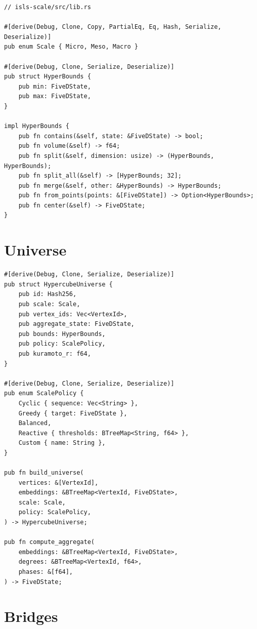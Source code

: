 \documentclass[11pt,a4paper,twoside]{article}
\theoremstyle{definition}
\theoremstyle{plain}
\theoremstyle{remark}
\begin{document}
\begin{verbatim}
// isls-scale/src/lib.rs

#[derive(Debug, Clone, Copy, PartialEq, Eq, Hash, Serialize, Deserialize)]
pub enum Scale { Micro, Meso, Macro }

#[derive(Debug, Clone, Serialize, Deserialize)]
pub struct HyperBounds {
    pub min: FiveDState,
    pub max: FiveDState,
}

impl HyperBounds {
    pub fn contains(&self, state: &FiveDState) -> bool;
    pub fn volume(&self) -> f64;
    pub fn split(&self, dimension: usize) -> (HyperBounds, HyperBounds);
    pub fn split_all(&self) -> [HyperBounds; 32];
    pub fn merge(&self, other: &HyperBounds) -> HyperBounds;
    pub fn from_points(points: &[FiveDState]) -> Option<HyperBounds>;
    pub fn center(&self) -> FiveDState;
}
\end{verbatim}

\section{Universe}\label{sec:api:universe}

\begin{verbatim}
#[derive(Debug, Clone, Serialize, Deserialize)]
pub struct HypercubeUniverse {
    pub id: Hash256,
    pub scale: Scale,
    pub vertex_ids: Vec<VertexId>,
    pub aggregate_state: FiveDState,
    pub bounds: HyperBounds,
    pub policy: ScalePolicy,
    pub kuramoto_r: f64,
}

#[derive(Debug, Clone, Serialize, Deserialize)]
pub enum ScalePolicy {
    Cyclic { sequence: Vec<String> },
    Greedy { target: FiveDState },
    Balanced,
    Reactive { thresholds: BTreeMap<String, f64> },
    Custom { name: String },
}

pub fn build_universe(
    vertices: &[VertexId],
    embeddings: &BTreeMap<VertexId, FiveDState>,
    scale: Scale,
    policy: ScalePolicy,
) -> HypercubeUniverse;

pub fn compute_aggregate(
    embeddings: &BTreeMap<VertexId, FiveDState>,
    degrees: &BTreeMap<VertexId, f64>,
    phases: &[f64],
) -> FiveDState;
\end{verbatim}

\section{Bridges}\label{sec:api:bridges}
\end{document}
